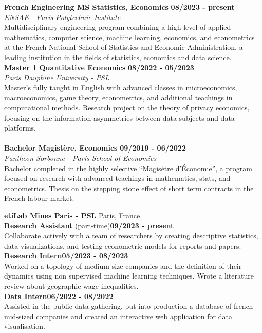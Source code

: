 	\begin{flushleft}
	\raisebox{-.6ex}{HIGHER EDUCATION} \hrulefill
	\end{flushleft}

	
\noindent\textbf{French Engineering MS \textbar\space Statistics,  Economics}
\hfill
\textbf{08/2023 - present} \\
\emph{ENSAE - Paris Polytechnic Institute}\\
Multidisciplinary engineering program combining a high-level of applied mathematics, computer science, machine learning, economics, and  econometrics at the French National School of Statistics and Economic Administration, a leading institution in the fields of statistics, economics and data science.  \\

\noindent\textbf{Master 1 \textbar\space Quantitative Economics}
\hfill
\textbf{08/2022 - 05/2023} \\
\emph{Paris Dauphine University - PSL}\\
Master's fully taught in English with advanced classes in microeconomics, macroeconomics, game theory,  econometrics, and additional teachings in computational methods. Research project on the theory of privacy economics, focusing on the information asymmetries between data subjects and data platforms. \\
\\
\noindent\textbf{Bachelor \textbar\space Magistère, Economics}
\hfill
\textbf{09/2019 - 06/2022} \\
\emph{Pantheon Sorbonne - Paris School of Economics}\\
Bachelor completed in the highly selective “Magisètre d'Économie”, a program focused on research with advanced teachings in mathematics, stats, and econometrics. Thesis on the stepping stone effect
of short term contracts in the French labour market.


	\begin{flushleft}
	\raisebox{-.6ex}{WORK \& RESEARCH EXPERIENCE} \hrulefill
	\end{flushleft}


\noindent\textbf{etiLab Mines Paris - PSL} \hfill Paris, France\\[0.1cm]
\textbf{Research Assistant} (part-time)\hfill \textbf{09/2023 - present} \\
Collaborate actively with a team of researchers by creating descriptive statistics, data visualizations, and testing econometric models for reports and papers.  \\
\textbf{Research Intern}\hfill \textbf{05/2023 - 08/2023} \\
Worked on a topology of medium size companies and the definition of their dynamics using non supervised machine learning techniques. Wrote a literature review about geographic wage inequalities.  \\[0.1cm]
\textbf{Data Intern}\hfill \textbf{06/2022 - 08/2022} \\
Assisted in the public data gathering, put into production a database of french mid-sized companies and created an interactive web application for data visualisation.\\

